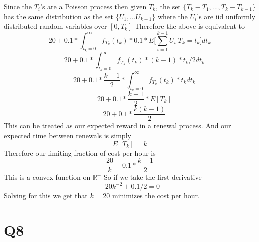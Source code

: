 \documentclass{article}
\begin{document}
Since the $T_i$'s are a Poisson process then given $T_k$, the set
$\{T_k - T_1,..., T_k - T_{k-1}\}$ has the same distribution as the set $\{U_1, ... U_{k-1}\}$ where the $U_i$'s are iid uniformly distributed random variables over $[0,T_k]$
Therefore the above is equivalent to 
$$
20 + 0.1 * \int_{t_k = 0} ^ \infty f_{T_k}(t_k) * 0.1*E\bigg[ \sum_{i = 1}^{k-1} U_i \bigg| T_k = t_k\bigg] dt_k
$$
$$
= 20 + 0.1 * \int_{t_k = 0} ^ \infty f_{T_k}(t_k) * (k-1) * t_k/2 dt_k
$$
$$
= 20 + 0.1 * \frac{k-1}{2}*\int_{t_k = 0} ^ \infty f_{T_k}(t_k) * t_k dt_k
$$
$$
= 20 + 0.1* \frac{k-1}{2}*E[T_k]
$$
$$
= 20 + 0.1 * \frac{k(k-1)}{2}
$$
This can be treated as our expected reward in a renewal process. And our expected time between renewals is simply
$$
E[T_k] = k
$$
Therefore our limiting fraction of cost per hour is
$$
\frac{20}{k} + 0.1*\frac{k-1}{2}
$$
This is a convex function on $\mathbb{R}^+$
So if we take the first derivative
$$
-20k^{-2} + 0.1/2 = 0
$$
Solving for this we get that $k = 20$ minimizes the cost per hour. 

\section*{Q8}
\end{document}
